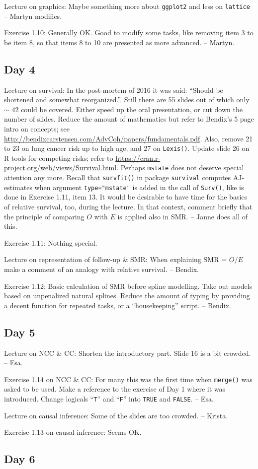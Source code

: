 \documentclass[11pt,a4]{article}
\begin{document}
Lecture on graphics: Maybe something more about {\tt ggplot2} 
and less on {\tt lattice} -- Martyn modifies.

Exercise 1.10: Generally OK. Good to modify some tasks, 
like removing item 3 to be item 8, so that items 8 to 10 are presented as more advanced. -- Martyn.

\subsection*{Day 4}

Lecture on survival: In the post-mortem of 2016 it was said: 
``Should be shortened and somewhat reorganized.''. 
Still there are 55 slides out of which only $\sim$ 42 could be covered. 
Either speed up the oral presentation, or cut down the number of slides.
Reduce the amount of mathematics but refer to Bendix's 5 page intro
on concepts; see \url{http://bendixcarstensen.com/AdvCoh/papers/fundamentals.pdf}.
Also, remove 21 to 23 on lung cancer risk up to high age, and 27 on {\tt Lexis()}.
Update slide 26 on R tools for competing risks; refer
to \url{https://cran.r-project.org/web/views/Survival.html}.
 Perhaps {\tt mstate} does not deserve special attention any more.
Recall that {\tt survfit()} 
in package {\tt survival} computes AJ-estimates when argument {\tt type="mstate"}
is added in the call of {\tt Surv()}, like is done in Exercise 1.11, item 13.
It would be desirable to have time for the basics of relative survival, too,
during the lecture. In that context, comment briefly that the principle of
comparing $O$ with $E$ is applied also in SMR.
-- Janne does all of this.

Exercise 1.11: Nothing special. 

Lecture on representation of follow-up \& SMR: When explaining SMR = $O/E$
 make a comment of an analogy with relative survival. -- Bendix. 

Exercise 1.12: Basic calculation of SMR before spline modelling.
Take out models based on unpenalized natural splines.
 Reduce the amount of typing by providing a decent function
for repeated tasks, or a ``housekeeping'' script. -- Bendix.  

\subsection*{Day 5}

Lecture on NCC \& CC: Shorten the introductory part. Slide 16 is a bit crowded. -- Esa. 

Exercise 1.14 on NCC \& CC: 
For many this was the first time when {\tt merge()} was asked to be used. 
Make a reference to the exercise of Day 1 where it was introduced.
Change logicals ``{\tt T}'' and ``{\tt F}'' into
{\tt TRUE} and {\tt FALSE}. -- Esa.

Lecture on causal inference: Some of the slides are too crowded. -- Krista.

Exercise 1.13 on causal inference: Seems OK.

\subsection*{Day 6}
\end{document}
